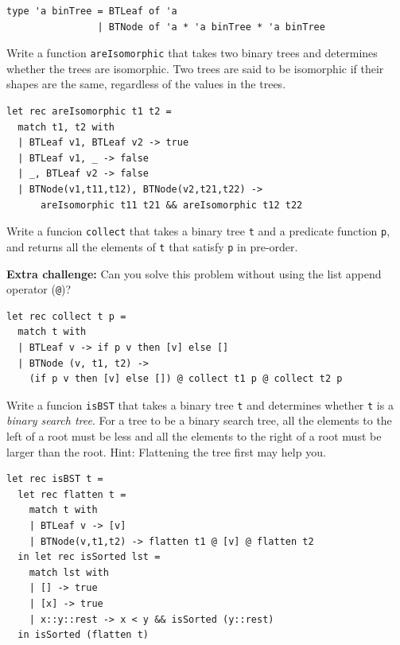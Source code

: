 \documentclass[addpoints]{exam}
\begin{document}
\begin{questions}
  \begin{verbatim}
type 'a binTree = BTLeaf of 'a
                | BTNode of 'a * 'a binTree * 'a binTree
  \end{verbatim}

  \question
  Write a function \texttt{areIsomorphic} that takes two binary trees and determines
  whether the trees are isomorphic. Two trees are said to be isomorphic if their shapes are the same,
  regardless of the values in the trees.

  \begin{solutionbox}{4.5cm}
    \begin{verbatim}
let rec areIsomorphic t1 t2 =
  match t1, t2 with
  | BTLeaf v1, BTLeaf v2 -> true
  | BTLeaf v1, _ -> false
  | _, BTLeaf v2 -> false
  | BTNode(v1,t11,t12), BTNode(v2,t21,t22) ->
      areIsomorphic t11 t21 && areIsomorphic t12 t22
    \end{verbatim}
  \end{solutionbox}


  \question
  Write a funcion \texttt{collect} that takes a binary tree \texttt{t} and 
  a predicate function \texttt{p}, and returns
  all the elements of \texttt{t} that satisfy \texttt{p} in pre-order.
  
  \textbf{Extra challenge:} Can you solve this problem without using the list append operator (\texttt{@})?

  \begin{solutionbox}{3.5cm}
    \begin{verbatim}
let rec collect t p =
  match t with
  | BTLeaf v -> if p v then [v] else []
  | BTNode (v, t1, t2) ->
    (if p v then [v] else []) @ collect t1 p @ collect t2 p
    \end{verbatim}
  \end{solutionbox}


  \question
  Write a funcion \texttt{isBST} that takes a binary tree \texttt{t} and 
  determines whether \texttt{t} is a \emph{binary search tree}.
  For a tree to be a binary search tree, 
  all the elements to the left of a root must be less and all the elements to the right of a 
  root must be larger than the root.
  Hint: Flattening the tree first may help you.

  \begin{solutionbox}{6cm}
    \begin{verbatim}
let rec isBST t =
  let rec flatten t =
    match t with
    | BTLeaf v -> [v]
    | BTNode(v,t1,t2) -> flatten t1 @ [v] @ flatten t2
  in let rec isSorted lst =
    match lst with
    | [] -> true
    | [x] -> true
    | x::y::rest -> x < y && isSorted (y::rest)
  in isSorted (flatten t)
    \end{verbatim}
  \end{solutionbox}


\end{questions}
\end{document}
